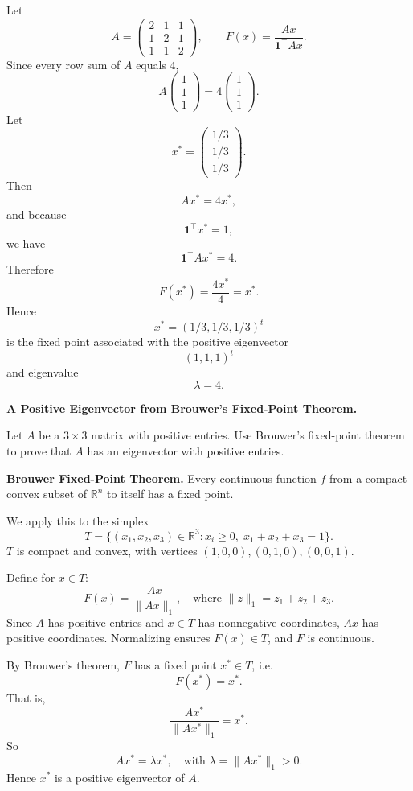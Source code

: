 \begin{solution}
Let
\[
A=
\begin{pmatrix}
2&1&1\\
1&2&1\\
1&1&2
\end{pmatrix},
\qquad
F(x)=\frac{Ax}{\mathbf1^\top Ax}.
\]
Since every row sum of \(A\) equals \(4\),
\[
A
\begin{pmatrix}
1\\1\\1
\end{pmatrix}
=
4
\begin{pmatrix}
1\\1\\1
\end{pmatrix}.
\]
Let
\[
x^*
=
\begin{pmatrix}
1/3\\1/3\\1/3
\end{pmatrix}.
\]
Then
\[
Ax^*
=
4x^*,
\]
and because
\[
\mathbf1^\top x^*=1,
\]
we have
\[
\mathbf1^\top Ax^*
=
4.
\]
Therefore
\[
F(x^*)
=
\frac{4x^*}{4}
=
x^*.
\]
Hence
\[
\boxed{
x^*
=
(1/3,1/3,1/3)^t
}
\]
is the fixed point associated with the positive eigenvector
\[
(1,1,1)^t
\]
and eigenvalue
\[
\boxed{\lambda=4.}
\]
\end{solution}


\begin{problem}[CP-II-0119]
\label{prob:cp-ii-0119}
\textbf{A Positive Eigenvector from Brouwer's Fixed-Point Theorem.}

\hspace*{1.5em}Let $A$ be a $3\times 3$ matrix with positive entries. Use Brouwer's fixed-point theorem to prove that $A$ has an eigenvector with positive entries.

\textbf{Brouwer Fixed-Point Theorem.}
Every continuous function $f$ from a compact convex subset of $\mathbb{R}^n$ to itself has a fixed point.

\medskip
We apply this to the simplex
\[
T = \{(x_1,x_2,x_3)\in\mathbb{R}^3 : x_i \geq 0,\; x_1+x_2+x_3=1\}.
\]
$T$ is compact and convex, with vertices $(1,0,0),(0,1,0),(0,0,1)$.
\end{problem}

\begin{solution}
Define for $x \in T$:
\[
F(x) = \frac{Ax}{\|Ax\|_1}, \quad \text{where } \|z\|_1 = z_1+z_2+z_3.
\]
Since $A$ has positive entries and $x\in T$ has nonnegative coordinates, $Ax$ has positive coordinates.
Normalizing ensures $F(x)\in T$, and $F$ is continuous.

By Brouwer's theorem, $F$ has a fixed point $x^*\in T$, i.e.
\[
F(x^*) = x^*.
\]
That is,
\[
\frac{Ax^*}{\|Ax^*\|_1} = x^*.
\]
So
\[
Ax^* = \lambda x^*, \quad \text{with } \lambda = \|Ax^*\|_1>0.
\]
Hence $x^*$ is a positive eigenvector of $A$.
\end{solution}

